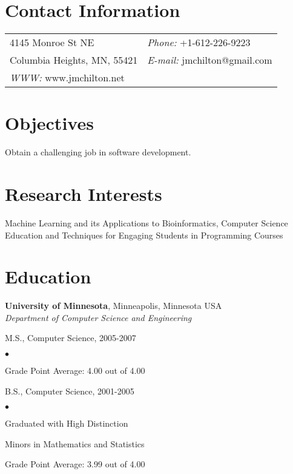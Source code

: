 \documentclass[margin,line]{res}
\newenvironment{list1}{
  \begin{list}{\ding{113}}{%
      \setlength{\itemsep}{0in}
      \setlength{\parsep}{0in} \setlength{\parskip}{0in}
      \setlength{\topsep}{0in} \setlength{\partopsep}{0in} 
      \setlength{\leftmargin}{0.17in}}}{\end{list}}
\newenvironment{list2}{
  \begin{list}{$\bullet$}{%
      \setlength{\itemsep}{0in}
      \setlength{\parsep}{0in} \setlength{\parskip}{0in}
      \setlength{\topsep}{0in} \setlength{\partopsep}{0in} 
      \setlength{\leftmargin}{0.2in}}}{\end{list}}
\begin{document}


\begin{resume}
\section{\sc Contact Information}
\vspace{.05in}
\begin{tabular}{@{}p{3in}p{4in}}
4145 Monroe St NE             & {\it Phone:}  +1-612-226-9223\\            
Columbia Heights, MN, 55421   & {\it E-mail:}  jmchilton@gmail.com \\
{\it WWW:} www.jmchilton.net  & \\     
\end{tabular}

{
\section{\sc Objectives}
Obtain a challenging job in software development.
}
{
\section{\sc Research Interests}
Machine Learning and its Applications to Bioinformatics, Computer Science Education and Techniques for Engaging Students in Programming Courses
}

\section{\sc Education}
{\bf University of Minnesota}, Minneapolis, Minnesota USA\\
{\em Department of Computer Science and Engineering} 
\vspace*{.1in}
\begin{list1}
\item[] M.S., Computer Science, 2005-2007
\begin{list2}
\item Grade Point Average: 4.00 out of 4.00
\end{list2}
\end{list1}
\vspace*{.1in}
\begin{list1}
\item[] B.S., Computer Science,  2001-2005
\begin{list2}
\item Graduated with High Distinction
\item Minors in Mathematics and Statistics
\item Grade Point Average: 3.99 out of 4.00
\end{list2}
\end{list1}



\end{resume}
\end{document}
